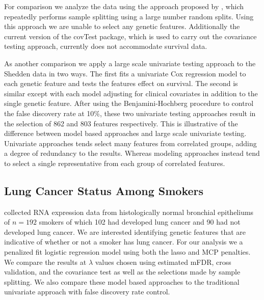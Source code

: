 For comparison we analyze the data using the approach proposed by \citet{Meinshausen2009}, which repeatedly performs sample splitting using a large number random splits. Using this approach we are unable to select any genetic features. Additionally the current version of the covTest package, which is used to carry out the covariance testing approach, currently does not accommodate survival data.

As another comparison we apply a large scale univariate testing approach to the Shedden data in two ways. The first fits a univariate Cox regression model to each genetic feature and tests the features effect on survival.  The second is similar except with each model adjusting for clinical covariates in addition to the single genetic feature.  After using the Benjamini-Hochberg procedure to control the false discovery rate at 10\%, these two univariate testing approaches result in the selection of 862 and 803 features respectively. This is illustrative of the difference between model based approaches and large scale univariate testing. Univariate approaches tends select many features from correlated groups, adding a degree of redundancy to the results. Whereas modeling approaches instead tend to select a single representative from each group of correlated features.  

\subsection{Lung Cancer Status Among Smokers}
\citet{Spira2007} collected RNA expression data from histologically normal bronchial epitheliums of $n = 192$ smokers of which 102 had developed lung cancer and 90 had not developed lung cancer.  We are interested identifying genetic features that are indicative of whether or not a smoker has lung cancer.  For our analysis we a penalized fit logistic regression model using both the lasso and MCP penalties. We compare the results at $\lambda$ values chosen using estimated mFDR, cross validation, and the covariance test as well as the selections made by sample splitting. We also compare these model based approaches to the traditional univariate approach with false discovery rate control.

